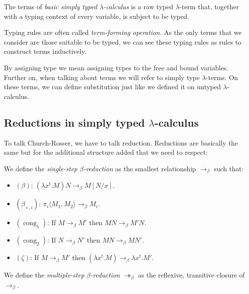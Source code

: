 \begin{definition}
  The terms of \emph{basic simply typed $\lambda$-calculus} is a raw typed $\lambda$-term that, together with a typing context of every variable, is subject to be typed.
\end{definition}
\begin{remark}
  Typing rules are often called \emph{term-forming operation}. As the only terms that we consider are those suitable to be typed, we can see these typing rules as rules to construct terms inductively.
\end{remark}

By assigning type we mean assigning types to the free and bound variables. Further on, when talking about terms we will refer to simply type $\lambda$-terms. On these terms, we can define substitution just like we defined it on untyped $\lambda$-calculus.


\subsection{Reductions in simply typed $\lambda$-calculus}

To talk Church-Rosser, we have to talk reduction. Reductions are basically the same but for the additional structure added that we need to respect: 

\begin{definition}
  We define the \emph{single-step} $\beta$\emph{-reduction} as the smallest relationship $\to_\beta$ such that:
  \begin{itemize}
  \item[]$(\beta)$: $ (\lambda x^t.M)N \to_\beta M[N/x]$.\\
  \item[]$(\beta_{\times,i})$: $\pi_i\langle M_1,M_2\rangle \to_\beta M_i$.\\
  \item[]$(\operatorname{cong}_1)$: If $ M \to_\beta M'$ then $MN \to_\beta M'N$.\\
  \item[]$(\operatorname{cong}_2)$: If $ N \to_\beta N'$ then $ MN \to_\beta MN'$.\\
  \item[]$(\zeta)$: If $M\to_\beta M'$ then $(\lambda x^t.M) \to_\beta \lambda x^t.M'$.\\
  \end{itemize}
  We define the \emph{multiple-step} $\beta$\emph{-reduction} $\twoheadrightarrow_\beta$ as the reflexive, transitive closure of $\to_\beta$.
\end{definition}

